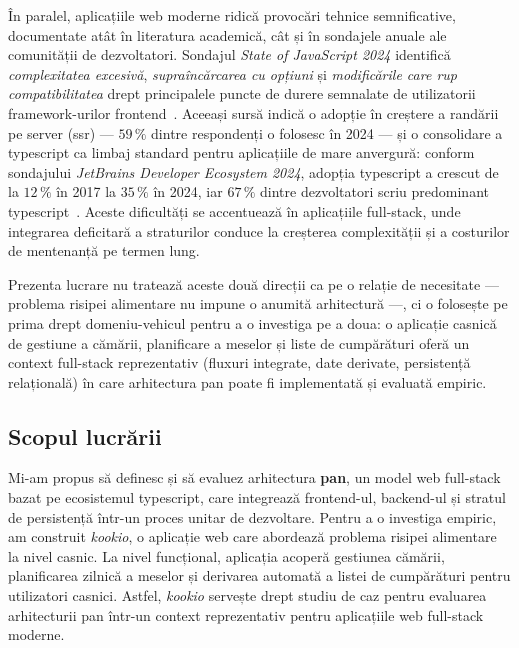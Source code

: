 În paralel, aplicațiile \gls{web} moderne ridică provocări tehnice semnificative, documentate atât în literatura academică, cât și în sondajele anuale ale comunității de dezvoltatori.
Sondajul \textit{State of JavaScript 2024} identifică \emph{complexitatea excesivă}, \emph{supraîncărcarea cu opțiuni} și \emph{modificările care rup compatibilitatea} drept principalele puncte de durere semnalate de utilizatorii framework-urilor frontend~\cite{stateOfJS2024}.
Aceeași sursă indică o adopție în creștere a randării pe server (\acrshort{ssr}) --- \(59\,\%\) dintre respondenți o folosesc în 2024 --- și o consolidare a \gls{typescript} ca limbaj standard pentru aplicațiile de mare anvergură: conform sondajului \textit{JetBrains Developer Ecosystem 2024}, adopția \gls{typescript} a crescut de la \(12\,\%\) în 2017 la \(35\,\%\) în 2024, iar \(67\,\%\) dintre dezvoltatori scriu predominant \gls{typescript}~\cite{jetbrainsJsSurvey2024}.
Aceste dificultăți se accentuează în aplicațiile full-stack, unde integrarea deficitară a straturilor conduce la creșterea complexității și a costurilor de mentenanță pe termen lung.

Prezenta lucrare nu tratează aceste două direcții ca pe o relație de necesitate --- problema risipei alimentare nu impune o anumită arhitectură ---, ci o folosește pe prima drept domeniu-vehicul pentru a o investiga pe a doua: o aplicație casnică de gestiune a cămării, planificare a meselor și liste de cumpărături oferă un context full-stack reprezentativ (fluxuri integrate, date derivate, persistență relațională) în care arhitectura \gls{pan} poate fi implementată și evaluată empiric.

\subsection{Scopul lucrării}\label{sec:scop}
Mi-am propus să definesc și să evaluez arhitectura \textbf{\gls{pan}}, un model \gls{web} full-stack bazat pe ecosistemul \gls{typescript}, care integrează frontend-ul, backend-ul și stratul de persistență într-un proces unitar de dezvoltare.
Pentru a o investiga empiric, am construit \textit{\gls{kookio}}, o aplicație \gls{web} care abordează problema risipei alimentare la nivel casnic.
La nivel funcțional, aplicația acoperă gestiunea cămării, planificarea zilnică a meselor și derivarea automată a listei de cumpărături pentru utilizatori casnici.
Astfel, \textit{\gls{kookio}} servește drept studiu de caz pentru evaluarea arhitecturii \gls{pan} într-un context reprezentativ pentru aplicațiile \gls{web} full-stack moderne.

